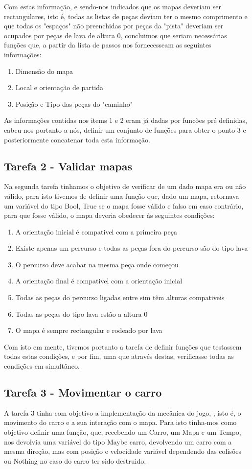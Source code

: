 \documentclass[a4paper]{report} %
\begin{document}
Com estas informação, e sendo-nos indicados que os mapas deveriam ser rectangulares, isto é, todas as listas de peças deviam ter o mesmo comprimento e que todas os "espaços" não preenchidas por peças da "pista" deveriam ser ocupados por peças de lava de altura 0, concluimos que seriam necessárias funções que, a partir da lista de passos nos fornecesseam as seguintes informações:

\begin{enumerate}
\item Dimensão do mapa
\item Local e orientação de partida
\item Posição e Tipo das peças do "caminho"
\end{enumerate}
As informações contidas nos items 1 e 2 eram já dadas por funcões pré definidas, cabeu-nos portanto a nós, definir um conjunto de funções para obter o ponto 3 e posteriormente concatenar toda esta informação.

\subsection{Tarefa 2 - Validar mapas}
Na segunda tarefa tinhamos o objetivo de verificar de um dado mapa era ou não válido, para isto tivemos de definir uma função que, dado um mapa, retornava um variável do tipo Bool, True se o mapa fosse válido e falso em caso contrário, para que fosse válido, o mapa deveria obedecer ás seguintes condições:
\begin{enumerate}
\item A orientação inicial é compativel com a primeira peça
\item Existe apenas um percurso e todas as peças fora do percurso são do tipo lava 
\item O percurso deve acabar na mesma peça onde começou
\item A orientação final é compativel com a orientação inicial
\item Todas as peças do percurso ligadas entre sim têm alturas compativeis
\item Todas as peças do tipo lava estão a altura 0
\item O mapa é sempre rectangular e rodeado por lava
\end{enumerate}
Com isto em mente, tivemos portanto a tarefa de definir funções que testassem todas estas condições, e por fim, uma que através destas, verificasse todas as condições em simultâneo.

\subsection{Tarefa 3 - Movimentar o carro}
A tarefa 3 tinha com objetivo a implementação da mecânica do jogo, , isto é, o movimento do carro e a sua interação com o mapa.
Para isto tinha-mos como objetivo definir uma função, que, recebendo um Carro, um Mapa e um Tempo, nos devolvia uma variável do tipo Maybe carro, devolvendo um carro com a mesma direção, mas com posição e velocidade variável dependendo das colisões ou Nothing no caso do carro ter sido destruido. 
\end{document}
